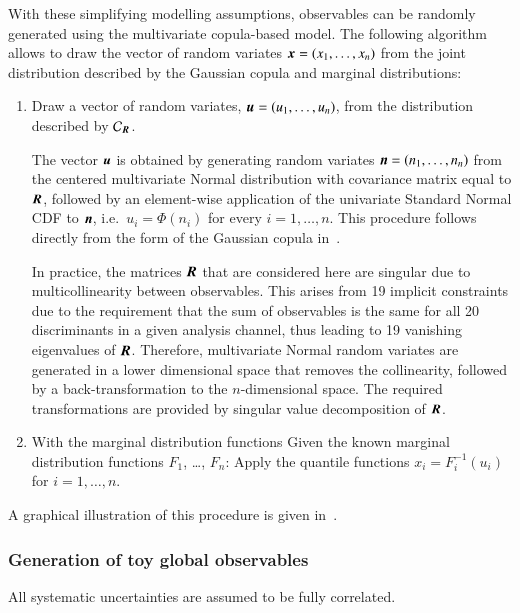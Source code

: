 With these simplifying modelling assumptions, observables can be
randomly generated using the multivariate copula-based model. The
following algorithm allows to draw the vector of random variates
$\myvec{x} = (x_1, \dots, x_n)$ from the joint distribution described
by the Gaussian copula and marginal distributions:
\begin{enumerate}
\item Draw a vector of random variates,
  $\myvec{u} = (u_1, \dots, u_n)$, from the distribution described by
  $\mathcal{C}_{\myvec{R}}$.

  The vector $\myvec{u}$ is obtained by generating random variates
  $\myvec{n} = (n_1, \dots, n_n)$ from the centered multivariate
  Normal distribution with covariance matrix equal to $\myvec{R}$,
  followed by an element-wise application of the univariate Standard
  Normal CDF to $\myvec{n}$, i.e.\ $u_i = \Phi(n_i)$ for every
  $i = 1, \dots, n$. This procedure follows directly from the form of
  the Gaussian copula in~.

  In practice, the matrices $\myvec{R}$ that are considered here are
  singular due to multicollinearity between observables. This arises
  from 19 implicit constraints due to the requirement that the sum of
  observables is the same for all 20 discriminants in a given analysis
  channel, thus leading to 19 vanishing eigenvalues of
  $\myvec{R}$. Therefore, multivariate Normal random variates are
  generated in a lower dimensional space that removes the
  collinearity, followed by a back-transformation to the
  $n$-dimensional space. The required transformations are provided by
  singular value decomposition of $\myvec{R}$.

\item With the marginal distribution functions
  Given the known marginal distribution functions $F_1$, \dots,
  $F_n$: Apply the quantile functions $x_i = F_{i}^{-1}(u_i)$ for
  $i = 1, \dots, n$.

\end{enumerate}
A graphical illustration of this procedure is given
in~.





\subsubsection{Generation of toy global observables}

All systematic uncertainties are assumed to be fully correlated.

